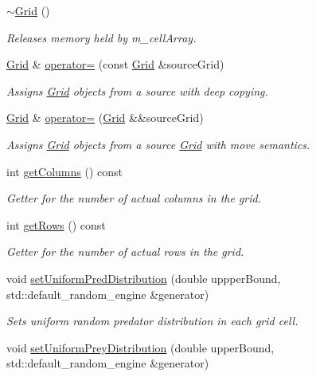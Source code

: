 \begin{DoxyCompactItemize}
\hyperlink{class_grid_a3661d0a7f998caaaf8627d7a67072116}{$\sim$\+Grid} ()
\begin{DoxyCompactList}\small\item\em Releases memory held by m\+\_\+cell\+Array. \end{DoxyCompactList}\item 
\hyperlink{class_grid}{Grid} \& \hyperlink{class_grid_aae7b118be13f65bf2e3a72881d8a06df}{operator=} (const \hyperlink{class_grid}{Grid} \&source\+Grid)
\begin{DoxyCompactList}\small\item\em Assigns \hyperlink{class_grid}{Grid} objects from a source with deep copying. \end{DoxyCompactList}\item 
\hyperlink{class_grid}{Grid} \& \hyperlink{class_grid_a9f84434eb37abc5cd0979cd609b2a2d8}{operator=} (\hyperlink{class_grid}{Grid} \&\&source\+Grid)
\begin{DoxyCompactList}\small\item\em Assigns \hyperlink{class_grid}{Grid} objects from a source \hyperlink{class_grid}{Grid} with move semantics. \end{DoxyCompactList}\item 
int \hyperlink{class_grid_aee0114021b6858483965cc1bffd7b88b}{get\+Columns} () const
\begin{DoxyCompactList}\small\item\em Getter for the number of actual columns in the grid. \end{DoxyCompactList}\item 
int \hyperlink{class_grid_aa9397afb775457f87b9096acf6082383}{get\+Rows} () const
\begin{DoxyCompactList}\small\item\em Getter for the number of actual rows in the grid. \end{DoxyCompactList}\item 
void \hyperlink{class_grid_a3a67056a86378f8ce24cdf3c19ee7817}{set\+Uniform\+Pred\+Distribution} (double uppper\+Bound, std\+::default\+\_\+random\+\_\+engine \&generator)
\begin{DoxyCompactList}\small\item\em Sets uniform random predator distribution in each grid cell. \end{DoxyCompactList}\item 
void \hyperlink{class_grid_a2f366ddaaa75475a9597f9a85ab24d59}{set\+Uniform\+Prey\+Distribution} (double upper\+Bound, std\+::default\+\_\+random\+\_\+engine \&generator)

\end{DoxyCompactItemize}
